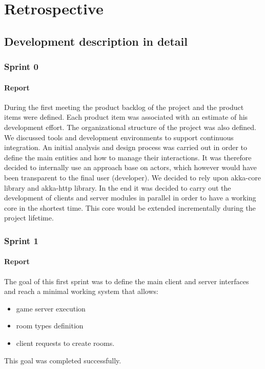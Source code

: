 \chapter{Retrospective}

\section{Development description in detail}

\subsection{Sprint 0}
\subsubsection{Report}
During the first meeting the product backlog of the project and the product items were defined. Each product item was associated with an estimate of his development effort.
The organizational structure of the project was also defined. We discussed tools and development environments to support continuous integration.
An initial analysis and design process was carried out in order to define the main entities and how to manage their interactions.
It was therefore decided to internally use an approach base on actors, which however would have been transparent to the final user (developer). 
We decided to rely upon akka-core library and akka-http library. 
In the end it was decided to carry out the development of clients and server modules in parallel in order to have a working core in the shortest time. This core would be extended incrementally during the project lifetime.




\subsection{Sprint 1}
\subsubsection{Report}
The goal of this first sprint was to define the main client and server interfaces and reach a minimal working system that allows:
\begin{itemize}
	\item game server execution 
	\item room types definition
	\item client requests to create rooms.
\end{itemize}
This goal was completed successfully. 


